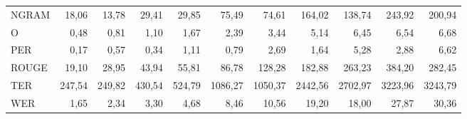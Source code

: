 \documentclass[11pt,a4paper]{article}
\begin{document}
\begin{table}[H]
{\begin{tabular}{l r r | r r | r r | r r | r r }
NGRAM  & 18,06         & 13,78        & 29,41         & 29,85         & 75,49         & 74,61         & 164,02         & 138,74        & 243,92         & 200,94        \\
O      & 0,48          & 0,81         & 1,10          & 1,67          & 2,39          & 3,44          & 5,14           & 6,45          & 6,54           & 6,68          \\
PER    & 0,17          & 0,57         & 0,34          & 1,11          & 0,79          & 2,69          & 1,64           & 5,28          & 2,88           & 6,62          \\
ROUGE  & 19,10         & 28,95        & 43,94         & 55,81         & 86,78         & 128,28        & 182,88         & 263,23        & 384,20         & 282,45        \\
TER    & 247,54        & 249,82       & 430,54        & 524,79        & 1086,27       & 1050,37       & 2442,56        & 2702,97       & 3223,96        & 3243,79       \\
WER    & 1,65          & 2,34         & 3,30          & 4,68          & 8,46          & 10,56         & 19,20          & 18,00         & 27,87          & 30,36        \\
\hline
\end{tabular}}
\label{table:Ex1-ws_corpus500}
\normalsize
\end{table}
\end{document}
